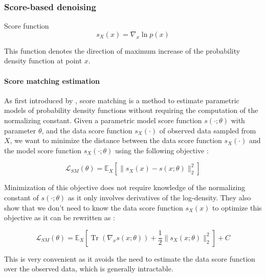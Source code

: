\subsubsection{Score-based denoising}


\begin{definition}{Score function}
    \begin{equation}
        s_X(x) = \nabla_x \ln p(x)
    \end{equation}
\end{definition}

This function denotes the direction of maximum increase of the probability density function at point $x$.

\paragraph{Score matching estimation}

As first introduced by \cite{hyvarinen_estimation_2005}, score matching is a method to estimate parametric models of probability density functions without requiring the computation of the normalizing constant.
Given a parametric model score function $s(\cdot; \theta)$ with parameter $\theta$, and the data score function $s_X(\cdot)$ of observed data sampled from $X$, we want to minimize the distance between the data score function $s_X(\cdot)$ and the model score function $s_X(\cdot; \theta)$ using the following objective :

\begin{equation}
    \mathcal{L}_{SM}(\theta) = \mathbb{E}_X \left[ \| s_X(x) - s(x; \theta) \|_2^2 \right]
\end{equation}

Minimization of this objective does not require knowledge of the normalizing constant of $s(\cdot; \theta)$ as it only involves derivatives of the log-density.
They also show that we don't need to know the data score function $s_X(x)$ to optimize this objective as it can be rewritten as :

\begin{equation}
    \mathcal{L}_{SM}(\theta) = \mathbb{E}_X \left[ \mathop{Tr} \left( \nabla_x s(x; \theta) \right) + \frac{1}{2} \| s_X(x; \theta) \|_2^2 \right] + C
\end{equation}

This is very convenient as it avoids the need to estimate the data score function over the observed data, which is generally intractable.

